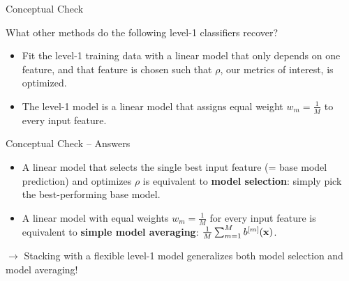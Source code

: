 \documentclass[11pt,compress,t,notes=noshow, xcolor=table]{beamer}
\begin{document}

\begin{vbframe}{Conceptual Check}

\vfill
What other methods do the following level-1 classifiers recover?
\vfill
\begin{itemize}
    \item Fit the level-1 training data with a linear model that only depends on one feature, and that feature is chosen such that $\rho$, our metrics of interest, is optimized.
    \item The level-1 model is a linear model that assigns equal weight $w_{m} = \frac{1}{M}$ to every input feature.
\end{itemize}
\vfill

\end{vbframe}


\begin{vbframe}{Conceptual Check -- Answers}

\vfill
\begin{itemize}
    \item A linear model that selects the single best input feature (= base model prediction) and optimizes $\rho$ is equivalent to \textbf{model selection}: simply pick the best-performing base model.
    \item A linear model with equal weights $w_{m} = \frac{1}{M}$ for every input feature is equivalent to \textbf{simple model averaging}: $\frac{1}{M} \sum_{m=1}^{M} b^{[m]}(\mathbf{x})$.
\end{itemize}
\vfill
$\rightarrow$ Stacking with a flexible level-1 model generalizes both model selection and model averaging!
\vfill

\end{vbframe}

\end{document}
